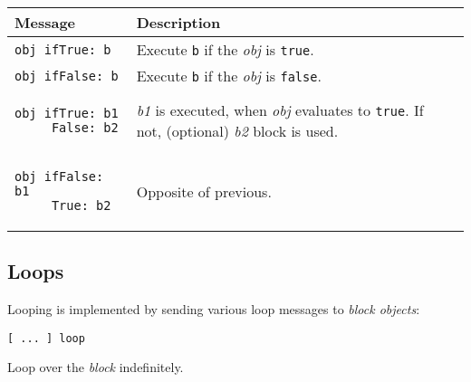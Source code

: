\documentclass[10pt]{article}
\begin{document}
\begin{multicols*}{3}
\vspace*{0.2cm}

\small{\begin{tabular}{ p{70pt} p{140pt} l l }
Message & Description
\\\hline\hline

\texttt{obj ifTrue: b}
&
Execute \texttt{b} if the \textit{obj} is \texttt{true}.
\\\hline %

\texttt{obj\ ifFalse:\ b}
&
Execute \texttt{b} if the \textit{obj} is \texttt{false}.
\\\hline %

\nointerlineskip
\begin{lstlisting}[aboveskip=0pt,belowskip=-0.8 \baselineskip]
obj ifTrue: b1
     False: b2
\end{lstlisting}
&
\textit{b1} is executed, when \textit{obj} evaluates to \texttt{true}.
If not, (optional) \textit{b2} block is used.
\\\hline %

\nointerlineskip
\begin{lstlisting}[aboveskip=-8pt,belowskip=-0.8 \baselineskip]
obj ifFalse: b1
     True: b2
\end{lstlisting}
&
Opposite of previous.
\\ %
\end{tabular}}




\subsection{Loops}
Looping is implemented by sending various loop messages to \textit{block objects}:

\begin{lstlisting}
[ ... ] loop
\end{lstlisting}
Loop over the \textit{block} indefinitely.


\end{multicols*}
\end{document}
